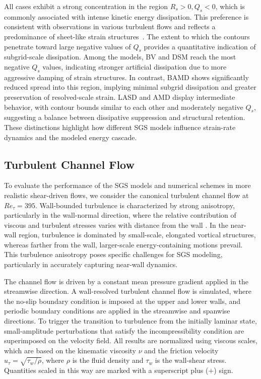 \documentclass[final,3p]{elsarticle}
\begin{document}
All cases exhibit a strong concentration in the region \( R_s > 0, Q_s < 0 \), which is commonly associated with intense kinetic energy dissipation. This preference is consistent with observations in various turbulent flows and reflects a predominance of sheet-like strain structures~\cite{ooi1999study,da2008invariants,singh2025characterization}. The extent to which the contours penetrate toward large negative values of \( Q_s \) provides a quantitative indication of subgrid-scale dissipation. Among the models, BV and DSM reach the most negative \( Q_s \) values, indicating stronger artificial dissipation due to more aggressive damping of strain structures. In contrast, BAMD shows significantly reduced spread into this region, implying minimal subgrid dissipation and greater preservation of resolved-scale strain. LASD and AMD display intermediate behavior, with contour bounds similar to each other and moderately negative \( Q_s \), suggesting a balance between dissipative suppression and structural retention. These distinctions highlight how different SGS models influence strain-rate dynamics and the modeled energy cascade.

\subsection{Turbulent Channel Flow}
\label{section:turbulentChannelFlow}
To evaluate the performance of the SGS models and numerical schemes in more realistic shear-driven flows, we consider the canonical turbulent channel flow at $Re_{\tau} = 395$. Wall-bounded turbulence is characterized by strong anisotropy, particularly in the wall-normal direction, where the relative contribution of viscous and turbulent stresses varies with distance from the wall \cite{townsend1976structure,den1997reynolds}. In the near-wall region, turbulence is dominated by small-scale, elongated vortical structures, whereas farther from the wall, larger-scale energy-containing motions prevail. This turbulence anisotropy poses specific challenges for SGS modeling, particularly in accurately capturing near-wall dynamics.

The channel flow is driven by a constant mean pressure gradient applied in the streamwise direction. A wall-resolved turbulent channel flow is simulated, where the no-slip boundary condition is imposed at the upper and lower walls, and periodic boundary conditions are applied in the streamwise and spanwise directions. To trigger the transition to turbulence from the initially laminar state, small-amplitude perturbations that satisfy the incompressibility condition are superimposed on the velocity field. All results are normalized using viscous scales, which are based on the kinematic viscosity $\nu$ and the friction velocity $u_\tau = \sqrt{\tau_w/\rho}$, where $\rho$ is the fluid density and $\tau_w$ is the wall-shear stress. Quantities scaled in this way are marked with a superscript plus ($+$) sign.
\end{document}
